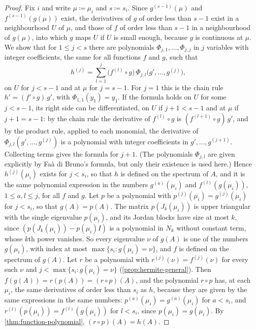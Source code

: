 \begin{proof}
Fix $i$ and write $\mu\coloneqq\mu_i$ and $s\coloneqq s_i$. Since $g^{(s-1)}(\mu)$ and $f^{(s-1)}(g(\mu))$ exist, the derivatives of $g$ of order less than $s-1$ exist in a neighbourhood $U$ of $\mu$, and those of $f$ of order less than $s-1$ in a neighbourhood of $g(\mu)$, into which $g$ maps $U$ if $U$ is small enough, because $g$ is continuous at $\mu$. We show that for $1\le j<s$ there are polynomials $\Phi_{j,1},\ldots,\Phi_{j,j}$ in $j$ variables with integer coefficients, the same for all functions $f$ and $g$, such that
\[
h^{(j)}=\sum_{l=1}^j\bigl(f^{(l)}\circ g\bigr)\,\Phi_{j,l}\bigl(g',\ldots,g^{(j)}\bigr),
\]
on $U$ for $j<s-1$ and at $\mu$ for $j=s-1$. For $j=1$ this is the chain rule $h'=(f'\circ g)\,g'$, with $\Phi_{1,1}(y_1)=y_1$. If the formula holds on $U$ for some $j<s-1$, its right side can be differentiated, on $U$ if $j+1<s-1$ and at $\mu$ if $j+1=s-1$: by the chain rule the derivative of $f^{(l)}\circ g$ is $(f^{(l+1)}\circ g)\,g'$, and by the product rule, applied to each monomial, the derivative of $\Phi_{j,l}(g',\ldots,g^{(j)})$ is a polynomial with integer coefficients in $g',\ldots,g^{(j+1)}$. Collecting terms gives the formula for $j+1$. (The polynomials $\Phi_{j,l}$ are given explicitly by Fa\`a di Bruno's formula, but only their existence is used here.) Hence $h^{(j)}(\mu_i)$ exists for $j<s_i$, so that $h$ is defined on the spectrum of $A$, and it is the same polynomial expression in the numbers $g^{(a)}(\mu_i)$ and $f^{(l)}(g(\mu_i))$, $1\le a,l\le j$, for all $f$ and $g$. Let $p$ be a polynomial with $p^{(j)}(\mu_i)=g^{(j)}(\mu_i)$ for $j<s_i$, so that $g(A)=p(A)$. The matrix $p(J_k(\mu_i))$ is upper triangular with the single eigenvalue $p(\mu_i)$, and its Jordan blocks have size at most $k$, since $(p(J_k(\mu_i))-p(\mu_i)I)$ is a polynomial in $N_k$ without constant term, whose $k$th power vanishes. So every eigenvalue $\nu$ of $g(A)$ is one of the numbers $g(\mu_i)$, with index at most $\max\{s_i:g(\mu_i)=\nu\}$, and $f$ is defined on the spectrum of $g(A)$. Let $r$ be a polynomial with $r^{(j)}(\nu)=f^{(j)}(\nu)$ for every such $\nu$ and $j<\max\{s_i:g(\mu_i)=\nu\}$ (\cref{prop:hermite-general}). Then $f(g(A))=r(p(A))=(r\circ p)(A)$, and the polynomial $r\circ p$ has, at each $\mu_i$, the same derivatives of order less than $s_i$ as $h$, because they are given by the same expressions in the same numbers: $p^{(a)}(\mu_i)=g^{(a)}(\mu_i)$ for $a<s_i$, and $r^{(l)}(p(\mu_i))=f^{(l)}(g(\mu_i))$ for $l<s_i$, since $p(\mu_i)=g(\mu_i)$. By \cref{thm:function-polynomial}, $(r\circ p)(A)=h(A)$.
\end{proof}

